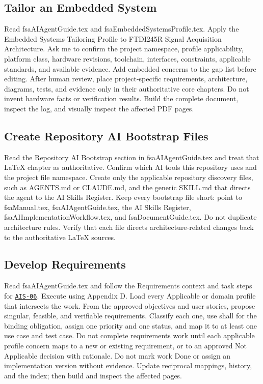 \subsection{Tailor an Embedded System}
\begingroup\ttfamily\raggedright
\noindent Read fsaAIAgentGuide.tex and fsaEmbeddedSystemsProfile.tex. Apply the Embedded Systems Tailoring Profile to FTDI245R Signal Acquisition Architecture. Ask me to confirm the project namespace, profile applicability, platform class, hardware revisions, toolchain, interfaces, constraints, applicable standards, and available evidence. Add embedded concerns to the gap list before editing. After human review, place project-specific requirements, architecture, diagrams, tests, and evidence only in their authoritative core chapters. Do not invent hardware facts or verification results. Build the complete document, inspect the log, and visually inspect the affected PDF pages.\par
\endgroup


\subsection{Create Repository AI Bootstrap Files}
\begingroup\ttfamily\raggedright
\noindent Read the Repository AI Bootstrap section in fsaAIAgentGuide.tex and treat that LaTeX chapter as authoritative. Confirm which AI tools this repository uses and the project file namespace. Create only the applicable repository discovery files, such as AGENTS.md or CLAUDE.md, and the generic SKILL.md that directs the agent to the AI Skills Register. Keep every bootstrap file short: point to fsaManual.tex, fsaAIAgentGuide.tex, the AI Skills Register, fsaAIImplementationWorkflow.tex, and fsaDocumentGuide.tex. Do not duplicate architecture rules. Verify that each file directs architecture-related changes back to the authoritative LaTeX sources.\par
\endgroup


\subsection{Develop Requirements}
\begingroup\ttfamily\raggedright
\noindent Read fsaAIAgentGuide.tex and follow the Requirements context and task steps for \hyperref[Skill:AIS-06]{\texttt{AIS-06}}. Execute using Appendix D. Load every Applicable or \OwnedTBD{} domain profile that intersects the work. From the approved objectives and user stories, propose singular, feasible, and verifiable requirements. Classify each one, use shall for the binding obligation, assign one priority and one status, and map it to at least one use case and test case. Do not complete requirements work until each applicable profile concern maps to a new or existing requirement, or to an approved Not Applicable decision with rationale. Do not mark work Done or assign an implementation version without evidence. Update reciprocal mappings, history, and the index; then build and inspect the affected pages.\par
\endgroup


